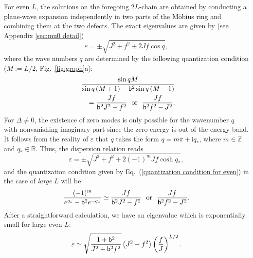 \documentclass[aps, prb, showpacs, twocolumn, %
amssymb,superscriptaddress]{revtex4}
\newcommand{\ii}{\text{i}}
\begin{document}
For even $L$, the solutions on the foregoing $2L$-chain are obtained by conducting a plane-wave expansion independently in two parts of the M\"obius ring and combining them at the two defects. The exact eigenvalues are given by (see Appendix \ref{sec:mu0 detail})
\begin{equation}
\varepsilon = \pm \sqrt{J^{2} + f^{2} + 2Jf \cos q},
	\label{dispersion relation}
\end{equation}
where the wave numbers $q$ are determined by the following quantization condition ($M:=L/2$, Fig.~\ref{fig:graph}a):
\begin{eqnarray}
\frac{\sin qM}{\sin q \left( M+1 \right) - {\sf b}^{2} \sin q \left( M-1 \right) } \nonumber \\
~~~~~= \frac{Jf}{{\sf b}^{2}J^{2} - f^{2}}~~\mathrm{or}~~\frac{Jf}{{\sf b}^{2}f^{2} - J^{2}}.
	\label{quantization condition for even}
\end{eqnarray}
For $\Delta \neq 0$, the existence of zero modes is only possible for the wavenumber $q$ with nonvanishing imaginary part since the zero energy is out of the energy band. 
It follows from the reality of $\varepsilon$ that $q$ takes the form 
$q = m\pi + \ii q_{*}$, where $m \in \mathbb{Z}$ and $q_{*} \in \mathbb{R}$.
Thus, the dispersion relation reads 
\begin{equation}
\varepsilon = \pm \sqrt{J^{2} + f^{2}+2 \left( - 1 \right)^{m} Jf \cosh q_{*}},
	\label{dispersion relation2}
\end{equation}
and the quantization condition given by Eq.~(\ref{quantization condition for even}) in the case of \emph{large} $L$ will be
\begin{eqnarray}
\frac{ (-1)^{m} }{e^{q_{*}} - {\sf b}^2 e^{-q_{*}}} \simeq \frac{Jf}{{\sf b}^{2}J^{2} -f^{2}}~~\mathrm{or}~~\frac{Jf}{{\sf b}^{2} f^{2}-J^{2}}.
\end{eqnarray}
After a straightforward calculation, we have an eigenvalue which is exponentially small for large even $L$:
\begin{equation}
\varepsilon
\simeq \sqrt{\frac{1+{\sf b}^{2}}{J^{2} + {\sf b}^{2}f^{2}}} \left( J^{2} - f^{2} \right) \left( \frac{f}{J} \right)^{L/2}.
\end{equation}
\end{document}
